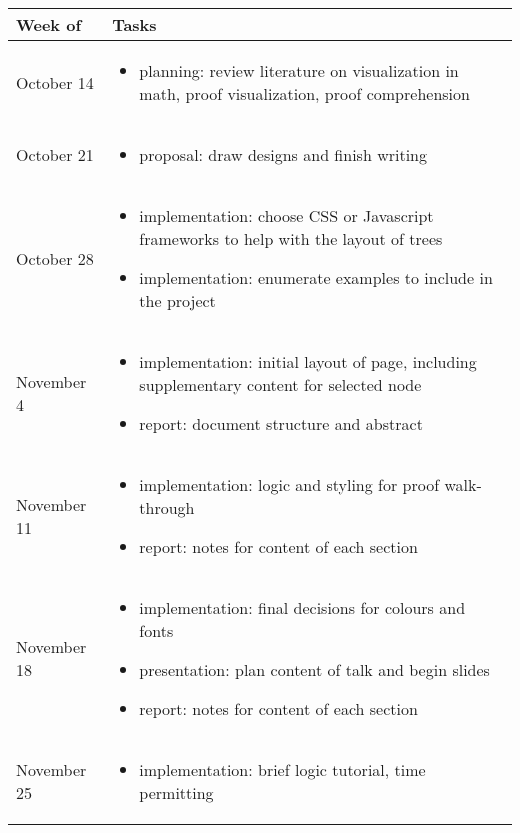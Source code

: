 \documentclass[12pt]{article}
\begin{document}
\begin{center}
\begin{tabular}{ | m{2.5cm} | m{14cm} | }
\hline
\textbf{Week of} & \textbf{Tasks} \\
\hline
October 14 & \begin{itemize}
	\item planning: review literature on visualization in math, proof visualization, proof comprehension
	\end{itemize} \\
\hline
October 21 &
	\begin{itemize}
	\item proposal: draw designs and finish writing
	\end{itemize} \\ 
\hline
October 28 &
	\begin{itemize}
	\item implementation: choose CSS or Javascript frameworks to help with the layout of trees
	\item implementation: enumerate examples to include in the project 
	\end{itemize} \\
\hline
November 4 &
	\begin{itemize}		
	\item implementation: initial layout of page, including supplementary content for selected node
	\item report: document structure and abstract
	\end{itemize} \\
\hline 
November 11 & \begin{itemize}		
	\item implementation: logic and styling for proof walk-through
	\item report: notes for content of each section
	\end{itemize} \\ 
\hline
November 18 & 
	\begin{itemize}		
	\item implementation: final decisions for colours and fonts
	\item presentation: plan content of talk and begin slides
	\item report: notes for content of each section
	\end{itemize} \\ 
\hline
November 25 & 
	\begin{itemize}		
	\item implementation: brief logic tutorial, time permitting

\end{itemize}
\end{tabular}
\end{center}
\end{document}
